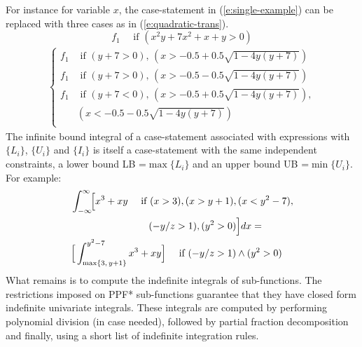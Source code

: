 \documentclass{article}
\newcommand{\case}[2]{#2 &\text{ if } #1}%
\newcommand{\singlecase}[2]{#2 \quad \text{ if } #1}
\begin{document}
{%
For instance for variable $x$, the case-statement in (\ref{e:single-example})
can be replaced with three cases as in (\ref{e:quadratic-trans}).
{
\footnotesize
\begin{equation}
\label{e:single-example}
\singlecase{(x^2 y + 7x^2 + x + y > 0)}{f_1}
\end{equation}
\begin{align}
\label{e:quadratic-trans}
{
\begin{cases}
  \case{(y+7>0), \, (x> -0.5 + 0.5\sqrt{1 - 4y(y+7)}) }{f_1} \\ 
  \case{(y+7>0), \, (x> -0.5 - 0.5\sqrt{1 - 4y(y+7)}) }{f_1} \\ 
  \case{(y+7<0), \, (x > -0.5 + 0.5\sqrt{1 - 4y(y+7)}),\\
& (x < -0.5 - 0.5\sqrt{1 - 4y(y+7)}) }{f_1} \\ 
 \end{cases}
}
\end{align}
}
The infinite bound integral of a case-statement 
associated with expressions with $\{L_i\}$, $\{U_i\}$ and $\{I_i\}$ 
is itself a case-statement with the same independent constraints,
a lower bound LB =$\max\{L_i\}$ and 
an upper bound UB =$ \min\{U_i\}$.
For example:
{\footnotesize 
\begin{align*}
&\int_{-\infty}^{\infty}\!\! \Big[
\singlecase{(x>3), (x>y+1), (x<y^2-7), \\
&\hspace{28mm} (-y/z > 1) , (y^2>0)}
{x^3 + xy} \Big] dx = \\
&\singlecase{(-y/z > 1) \wedge (y^2>0)}
{\Big[ \int_{\max\{3, \, y+1\}}^{y^2 - 7}x^3 + xy \Big]} 
\end{align*}  
}
What remains is to compute the indefinite integrals of sub-functions. 
The restrictions imposed on PPF* sub-functions 
guarantee that they have closed form indefinite univariate integrals.
These integrals are computed by performing polynomial division (in case needed),
followed by partial fraction decomposition and finally, using a short list of indefinite integration rules.

}
\end{document}
